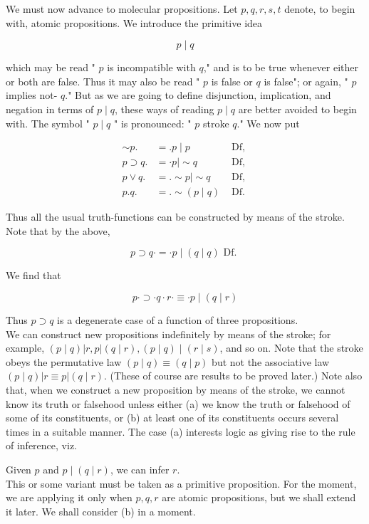 \documentclass[10pt]{article}
\begin{document}
We must now advance to molecular propositions. Let $p, q, r, s, t$ denote, to begin with, atomic propositions. We introduce the primitive idea

$$
p \mid q
$$

which may be read " $p$ is incompatible with $q$," and is to be true whenever either or both are false. Thus it may also be read " $p$ is false or $q$ is false"; or again, " $p$ implies not- $q$." But as we are going to define disjunction, implication, and negation in terms of $p \mid q$, these ways of reading $p \mid q$ are better avoided to begin with. The symbol " $p \mid q$ " is pronounced: " $p$ stroke $q$." We now put

$$
\begin{aligned}
\sim p . & =. p \mid p & \text { Df, } \\
p \supset q . & =\cdot p \mid \sim q & \text { Df, } \\
p \vee q . & =. \sim p \mid \sim q & \text { Df, } \\
p . q . & =. \sim(p \mid q) & \text { Df. }
\end{aligned}
$$

Thus all the usual truth-functions can be constructed by means of the stroke. Note that by the above,

$$
p \supset q \cdot=\cdot p \mid(q \mid q) \text { Df. }
$$

We find that

$$
p \cdot \supset \cdot q \cdot r \cdot \equiv \cdot p \mid(q \mid r)
$$

Thus $p \supset q$ is a degenerate case of a function of three propositions.\\
We can construct new propositions indefinitely by means of the stroke; for example, $(p \mid q)|r, p|(q \mid r),(p \mid q) \mid(r \mid s)$, and so on. Note that the stroke obeys the permutative law $(p \mid q) \equiv(q \mid p)$ but not the associative law $(p \mid q)|r \equiv p|(q \mid r)$. (These of course are results to be proved later.) Note also that, when we construct a new proposition by means of the stroke, we cannot know its truth or falsehood unless either (a) we know the truth or falsehood of some of its constituents, or (b) at least one of its constituents occurs several times in a suitable manner. The case (a) interests logic as giving rise to the rule of inference, viz.

Given $p$ and $p \mid(q \mid r)$, we can infer $r$.\\
This or some variant must be taken as a primitive proposition. For the moment, we are applying it only when $p, q, r$ are atomic propositions, but we shall extend it later. We shall consider (b) in a moment.
\end{document}
